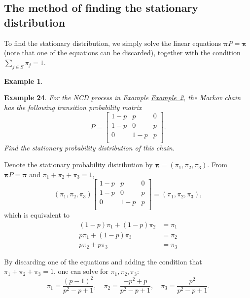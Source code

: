\documentclass[
]{book}
\theoremstyle{definition}
\theoremstyle{definition}
\newtheorem{example}{Example}[chapter]
\theoremstyle{definition}
\theoremstyle{definition}
\theoremstyle{remark}
\begin{document}
\hypertarget{the-method-of-finding-the-stationary-distribution}{%
\subsection*{The method of finding the stationary distribution}\label{the-method-of-finding-the-stationary-distribution}}

To find the stationary distribution, we simply solve the linear
equations \(\boldsymbol{\pi} P =\boldsymbol{\pi}\) (note that one of the
equations can be discarded), together with the condition
\(\sum_{j \in S} \pi_j = 1\).

\begin{example}
\protect\hypertarget{exm:unlabeled-div-25}{}\label{exm:unlabeled-div-25}

\textbf{Example 24}. \emph{For the NCD process in Example
\protect\hyperlink{NCD}{Example~2}, the Markov
chain has the following transition probability matrix
\[P = \begin{bmatrix}
    1- p & p & 0    \\
    1-p & 0 & p   \\
    0 & 1-p & p    \\
\end{bmatrix}.\] Find the stationary probability distribution of this
chain.}

\end{example}

Denote the stationary probability distribution by
\(\boldsymbol{\pi} = (\pi_1, \pi_2, \pi_3)\). From
\(\boldsymbol{\pi} P =\boldsymbol{\pi}\) and
\(\pi_1 + \pi_2 + \pi_3 = 1\),
\[(\pi_1,  \pi_2, \pi_3)  \begin{bmatrix}
    1- p & p & 0    \\
    1-p & 0 & p   \\
    0 & 1-p & p    \\
\end{bmatrix} =  (\pi_1,  \pi_2, \pi_3),\] which is equivalent to
\[\begin{aligned}
(1- p)\pi_1 + (1- p)\pi_2 &= \pi_1 \\
p\pi_1 + (1- p)\pi_3 &= \pi_2 \\
p\pi_2 + p\pi_3 &= \pi_3 \end{aligned}\]

By discarding one of the equations and adding the condition that
\(\pi_1 + \pi_2 + \pi_3 = 1\), one can solve for
\(\pi_1, \pi_2, \pi_3\):
\[\pi_1 = \frac{(p-1)^2}{p^2 - p + 1},  \quad \pi_2 = \frac{-p^2 + p}{p^2 - p + 1},  \quad \pi_3 = \frac{p^2}{p^2 - p + 1}.\]
\end{document}
